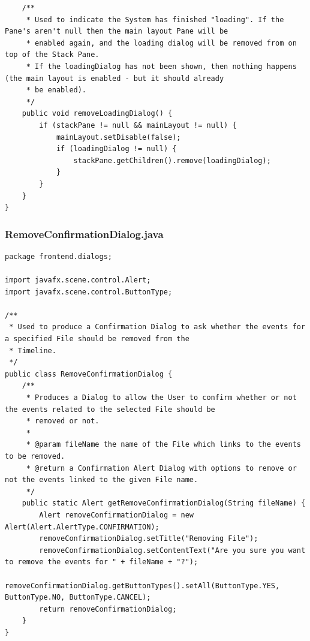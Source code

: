 \begin{lstlisting}
    /**
     * Used to indicate the System has finished "loading". If the Pane's aren't null then the main layout Pane will be
     * enabled again, and the loading dialog will be removed from on top of the Stack Pane.
     * If the loadingDialog has not been shown, then nothing happens (the main layout is enabled - but it should already
     * be enabled).
     */
    public void removeLoadingDialog() {
        if (stackPane != null && mainLayout != null) {
            mainLayout.setDisable(false);
            if (loadingDialog != null) {
                stackPane.getChildren().remove(loadingDialog);
            }
        }
    }
}
\end{lstlisting}
\subsubsection{RemoveConfirmationDialog.java}
\begin{lstlisting}
package frontend.dialogs;

import javafx.scene.control.Alert;
import javafx.scene.control.ButtonType;

/**
 * Used to produce a Confirmation Dialog to ask whether the events for a specified File should be removed from the
 * Timeline.
 */
public class RemoveConfirmationDialog {
    /**
     * Produces a Dialog to allow the User to confirm whether or not the events related to the selected File should be
     * removed or not.
     *
     * @param fileName the name of the File which links to the events to be removed.
     * @return a Confirmation Alert Dialog with options to remove or not the events linked to the given File name.
     */
    public static Alert getRemoveConfirmationDialog(String fileName) {
        Alert removeConfirmationDialog = new Alert(Alert.AlertType.CONFIRMATION);
        removeConfirmationDialog.setTitle("Removing File");
        removeConfirmationDialog.setContentText("Are you sure you want to remove the events for " + fileName + "?");
        removeConfirmationDialog.getButtonTypes().setAll(ButtonType.YES, ButtonType.NO, ButtonType.CANCEL);
        return removeConfirmationDialog;
    }
}
\end{lstlisting}
